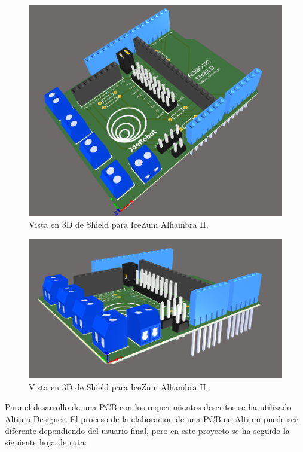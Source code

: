 	\begin{center}
		\begin{figure}[H]
			\center
			\includegraphics[scale=0.5]{imagenes/Balancing_Robot/Vista3D1.PNG}
			\caption{Vista en 3D de Shield para IceZum Alhambra II.}
			\label{fig:Vista3D1}
		\end{figure}
	\end{center}
	
	\begin{center}
		\begin{figure}[H]
			\center
			\includegraphics[scale=0.6]{imagenes/Balancing_Robot/Vista3D2.PNG}
			\caption{Vista en 3D de Shield para IceZum Alhambra II.}
			\label{fig:Vista3D2}
		\end{figure}
	\end{center}


Para el desarrollo de una PCB con los requerimientos descritos se ha utilizado Altium Designer. El proceso de la elaboración de una PCB en Altium puede ser diferente dependiendo del usuario final, pero en este proyecto se ha seguido la siguiente hoja de ruta:

